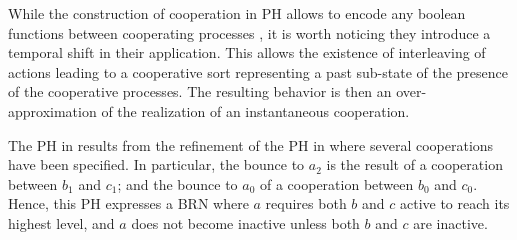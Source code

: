 While the construction of cooperation in PH allows to encode any boolean functions
between cooperating processes \cite{PMR10-TCSB}, it is worth noticing they introduce a temporal
shift in their application.
This allows the existence of interleaving of actions leading to a cooperative sort representing a
past sub-state of the presence of the cooperative processes.
The resulting behavior is then an over-approximation
of the realization of an instantaneous cooperation.

\begin{example*}
The PH in  results from the refinement of the PH in 
where several cooperations have been specified.
In particular, the bounce to $a_2$ is the result of a cooperation between $b_1$ and $c_1$; and the
bounce to $a_0$ of a cooperation between $b_0$ and $c_0$.
Hence, this PH expresses a BRN where $a$ requires both $b$ and $c$ active to reach its
highest level, and $a$ does not become inactive unless both $b$ and $c$ are inactive.
\end{example*}



